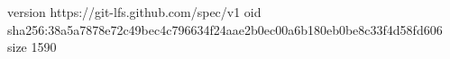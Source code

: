 version https://git-lfs.github.com/spec/v1
oid sha256:38a5a7878e72c49bec4c796634f24aae2b0ec00a6b180eb0be8c33f4d58fd606
size 1590
